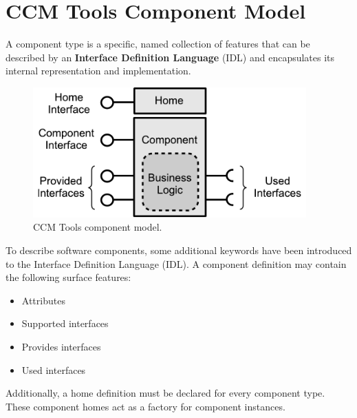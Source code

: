 \section{CCM Tools Component Model}
\label{section:CcmtoolsComponentModel}

A component type is a specific, named collection of features that can be
described by an {\bf Interface Definition Language} (IDL) and encapsulates its
internal representation and implementation.

\begin{figure}[htbp]
	\begin{center}
		\includegraphics[height=5cm,angle=0] {figures/CcmtoolsComponent}
		\caption{ CCM Tools component model.}
		\label{figure:CcmtoolsComponentModel}
  	\end{center}
\end{figure}


To describe software components, some additional keywords have been 
introduced to the Interface Definition Language (IDL). 
A component definition may contain the following surface features:
\begin{itemize}
\item Attributes  
\item Supported interfaces
\item Provides interfaces 
\item Used interfaces
\end{itemize}

Additionally, a home definition must be declared for every component
type. These component homes act as a factory for component instances.

